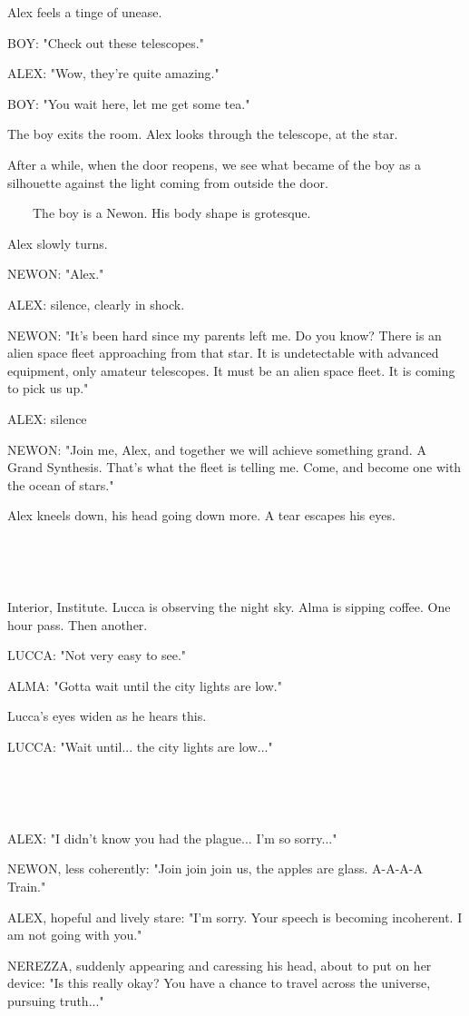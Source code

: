 \documentclass[11pt]{article}
\begin{document}
Alex feels a tinge of unease.

BOY: "Check out these telescopes."

ALEX: "Wow, they're quite amazing."

BOY: "You wait here, let me get some tea."

The boy exits the room.
Alex looks through the telescope, at the star.

After a while, when the door reopens, we see what became of the boy as a silhouette against the light coming from outside the door.

\ \ \ \ The boy is a Newon. His body shape is grotesque.

Alex slowly turns.

NEWON: "Alex."

ALEX: silence, clearly in shock.

NEWON: "It's been hard since my parents left me.
Do you know?
There is an alien space fleet approaching from that star.
It is undetectable with advanced equipment, only amateur telescopes.
It must be an alien space fleet. 
It is coming to pick us up."

ALEX: silence

NEWON: "Join me, Alex, and together we will achieve something grand. 
A Grand Synthesis. 
That's what the fleet is telling me.
Come, and become one with the ocean of stars."

Alex kneels down, his head going down more.
A tear escapes his eyes.

\ 

\ 

Interior, Institute.
Lucca is observing the night sky. 
Alma is sipping coffee.
One hour pass. Then another.

LUCCA: "Not very easy to see."

ALMA: "Gotta wait until the city lights are low."

Lucca's eyes widen as he hears this.

LUCCA: "Wait until... the city lights are low..."

\ 

\ 

ALEX: "I didn't know you had the plague...
I'm so sorry..."

NEWON, less coherently: "Join join join us, the apples are glass.
A-A-A-A Train."

ALEX, hopeful and lively stare: "I'm sorry.
Your speech is becoming incoherent.
I am not going with you."

NEREZZA, suddenly appearing and caressing his head, about to put on her device: "Is this really okay?
You have a chance to travel across the universe, pursuing truth..."
\end{document}
